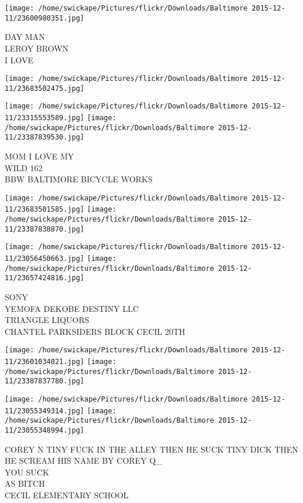 \documentclass[10pt,letterpaper]{article}
\begin{document}
\vspace{0.25in}
\texttt{[image: /home/swickape/Pictures/flickr/Downloads/Baltimore 2015-12-11/23600980351.jpg]}

DAY MAN\\
LEROY BROWN\\
I LOVE
\pagebreak

\texttt{[image: /home/swickape/Pictures/flickr/Downloads/Baltimore 2015-12-11/23683502475.jpg]}

\vspace{0.25in}
\texttt{[image: /home/swickape/Pictures/flickr/Downloads/Baltimore 2015-12-11/23315553589.jpg]}
\texttt{[image: /home/swickape/Pictures/flickr/Downloads/Baltimore 2015-12-11/23387839530.jpg]}

MOM I LOVE MY\\
WILD 162\\
BBW BALTIMORE BICYCLE WORKS
\pagebreak

\texttt{[image: /home/swickape/Pictures/flickr/Downloads/Baltimore 2015-12-11/23683501585.jpg]}
\texttt{[image: /home/swickape/Pictures/flickr/Downloads/Baltimore 2015-12-11/23387838870.jpg]}

\texttt{[image: /home/swickape/Pictures/flickr/Downloads/Baltimore 2015-12-11/23056450663.jpg]}
\texttt{[image: /home/swickape/Pictures/flickr/Downloads/Baltimore 2015-12-11/23657424816.jpg]}

SONY\\
YEMOFA DEKOBE DESTINY LLC\\
TRIANGLE LIQUORS\\
CHANTEL PARKSIDERS BLOCK CECIL 20TH
\pagebreak

\texttt{[image: /home/swickape/Pictures/flickr/Downloads/Baltimore 2015-12-11/23601034021.jpg]}
\texttt{[image: /home/swickape/Pictures/flickr/Downloads/Baltimore 2015-12-11/23387837780.jpg]}

\texttt{[image: /home/swickape/Pictures/flickr/Downloads/Baltimore 2015-12-11/23055349314.jpg]}
\texttt{[image: /home/swickape/Pictures/flickr/Downloads/Baltimore 2015-12-11/23055348994.jpg]}

COREY N TINY FUCK IN THE ALLEY THEN HE SUCK TINY DICK THEN HE SCREAM HIS NAME BY COREY Q\_\\
YOU SUCK\\
AS BITCH\\
CECIL ELEMENTARY SCHOOL
\pagebreak
\end{document}
